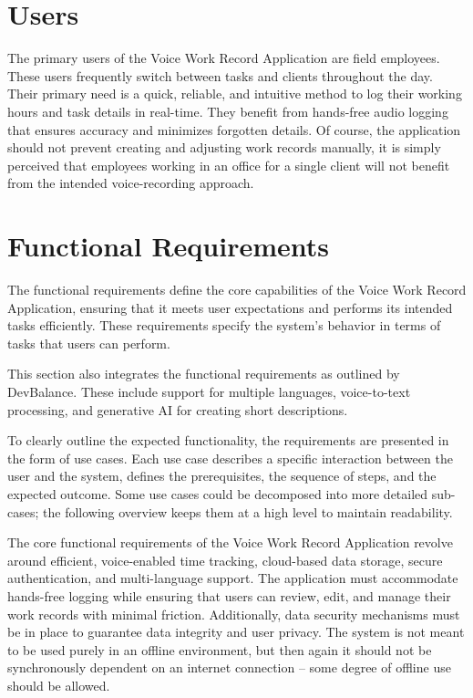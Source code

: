 \documentclass[
  digital,     %
  oneside,     %
  nosansbold,  %
  nocolorbold, %
  lof,         %
  lot,         %
]{fithesis4}
\begin{document}
\section{Users}

The primary users of the Voice Work Record Application are field employees. These users frequently switch between tasks and clients throughout the day. Their primary need is a quick, reliable, and intuitive method to log their working hours and task details in real-time. They benefit from hands-free audio logging that ensures accuracy and minimizes forgotten details. Of course, the application should not prevent creating and adjusting work records manually, it is simply perceived that employees working in an office for a single client will not benefit from the intended voice-recording approach.

\section{Functional Requirements}

The functional requirements define the core capabilities of the Voice Work Record Application, ensuring that it meets user expectations and performs its intended tasks efficiently. These requirements specify the system's behavior in terms of tasks that users can perform.

This section also integrates the functional requirements as outlined by DevBalance. These include support for multiple languages, voice-to-text processing, and generative AI for creating short descriptions.

To clearly outline the expected functionality, the requirements are presented in the form of use cases. Each use case describes a specific interaction between the user and the system, defines the prerequisites, the sequence of steps, and the expected outcome. Some use cases could be decomposed into more detailed sub-cases; the following overview keeps them at a high level to maintain readability.

The core functional requirements of the Voice Work Record Application revolve around efficient, voice-enabled time tracking, cloud-based data storage, secure authentication, and multi-language support. The application must accommodate hands-free logging while ensuring that users can review, edit, and manage their work records with minimal friction. Additionally, data security mechanisms must be in place to guarantee data integrity and user privacy. The system is not meant to be used purely in an offline environment, but then again it should not be synchronously dependent on an internet connection – some degree of offline use should be allowed.
\end{document}
